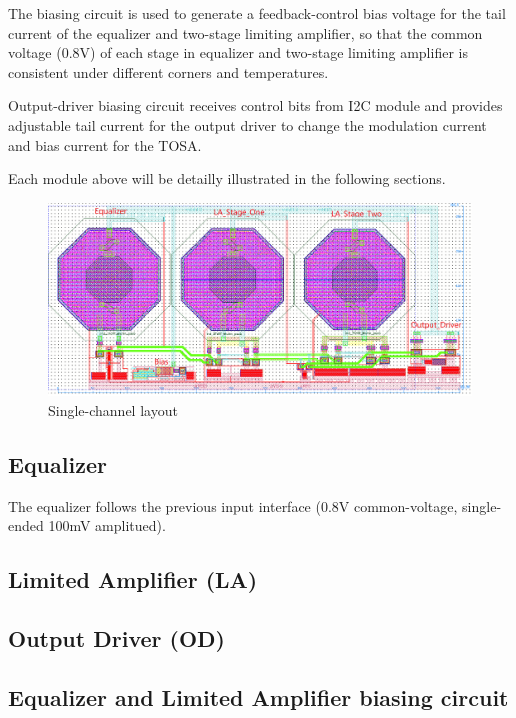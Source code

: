 \documentclass[11pt,a4paper]{article}
\begin{document}
\begin{spacing}{1.25}
The biasing circuit is used to generate a feedback-control bias voltage for the tail current of the equalizer and two-stage limiting amplifier, so that the common voltage (0.8V) of each stage in equalizer and two-stage limiting amplifier is consistent under different corners and temperatures.

Output-driver biasing circuit receives control bits from I2C module and provides adjustable tail current for the output driver to change the modulation current and bias current for the TOSA.

Each module above will be detailly illustrated in the following sections.
\begin{figure}[H]
    \includegraphics[width=\linewidth]{./Img/Layout_Eq_LA_OD_Background.png}
    \caption{Single-channel layout}
\end{figure}

\subsection{Equalizer}

The equalizer follows the previous input interface (0.8V common-voltage, single-ended 100mV amplitued).  

\subsection{Limited Amplifier (LA)}

\subsection{Output Driver (OD)}

\subsection{Equalizer and Limited Amplifier biasing circuit}


\end{spacing}
\end{document}
